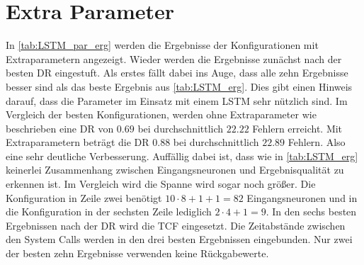 \section{Extra Parameter}\label{sec:erg_LSTM_extra}
    In \autoref{tab:LSTM_par_erg} werden die Ergebnisse der Konfigurationen mit Extraparametern angezeigt. 
    Wieder werden die Ergebnisse zunächst nach der besten \ac{DR} eingestuft.
    Als erstes fällt dabei ins Auge, dass alle zehn Ergebnisse besser sind als das beste Ergebnis aus \autoref{tab:LSTM_erg}.
    Dies gibt einen Hinweis darauf, dass die Parameter im Einsatz mit einem \ac{LSTM} sehr nützlich sind.
    Im Vergleich der besten Konfigurationen, werden ohne Extraparameter wie beschrieben eine \ac{DR} von $0.69$ bei durchschnittlich $22.22$ Fehlern erreicht.
    Mit Extraparametern beträgt die \ac{DR} $0.88$ bei durchschnittlich $22.89$ Fehlern.
    Also eine sehr deutliche Verbesserung.
    Auffällig dabei ist, dass wie in \autoref{tab:LSTM_erg} keinerlei Zusammenhang zwischen Eingangsneuronen und Ergebnisqualität zu erkennen ist.
    Im Vergleich wird die Spanne wird sogar noch größer.
    Die Konfiguration in Zeile zwei benötigt $10\cdot8 + 1 + 1=82$ Eingangsneuronen und in die Konfiguration in der sechsten Zeile  lediglich $2\cdot4 + 1 = 9$.
    In den sechs besten Ergebnissen nach der \ac{DR} wird die \ac{TCF} eingesetzt.
    Die Zeitabstände zwischen den System Calls werden in den drei besten Ergebnissen eingebunden.
    Nur zwei der besten zehn Ergebnisse verwenden keine Rückgabewerte.
